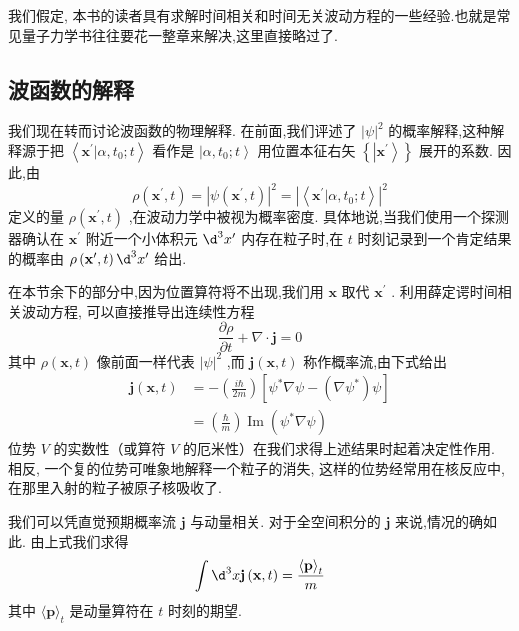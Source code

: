 \documentclass[lang=cn,newtx,10pt,scheme=chinese,thmcnt=section]{elegantbook}
\begin{document}
我们假定, 本书的读者具有求解时间相关和时间无关波动方程的一些经验.也就是常见量子力学书往往要花一整章来解决,这里直接略过了.
\subsection*{波函数的解释}
我们现在转而讨论波函数的物理解释. 在前面,我们评述了 ${\left| \psi \right| }^{2}$ 的概率解释,这种解释源于把 $\left\langle {{\mathbf{x}}^{\prime } | \alpha ,{t}_{0};t}\right\rangle$ 看作是 $\left. {| \alpha ,{t}_{0};t}\right\rangle$ 用位置本征右矢 $\left\{ \left| {\mathbf{x}}^{\prime }\right\rangle \right\}$ 展开的系数. 因此,由
\begin{equation}
	\rho \left( {{\mathbf{x}}^{\prime }, t}\right) = {\left| \psi \left( {\mathbf{x}}^{\prime }, t\right) \right| }^{2} = {\left| \left\langle {\mathbf{x}}^{\prime } | \alpha ,{t}_{0};t\right\rangle \right| }^{2}
\end{equation}
定义的量 $\rho \left( {{\mathbf{x}}^{\prime }, t}\right)$ ,在波动力学中被视为概率密度. 具体地说,当我们使用一个探测器确认在 ${\mathbf{x}}^{\prime }$ 附近一个小体积元 ${\d}^{3}{x}^{\prime }$ 内存在粒子时,在 $t$ 时刻记录到一个肯定结果的概率由 $\rho \left( {{\mathbf{x}}^{\prime }, t}\right) {\d}^{3}{x}^{\prime }$ 给出.

在本节余下的部分中,因为位置算符将不出现,我们用 $\mathbf{x}$ 取代 ${\mathbf{x}}^{\prime }$ . 利用薛定谔时间相关波动方程, 可以直接推导出连续性方程
\begin{equation}
	\frac{\partial \rho }{\partial t} + \nabla \cdot \mathbf{j} = 0
\end{equation}
其中 $\rho \left( {\mathbf{x}, t}\right)$ 像前面一样代表 ${\left| \psi \right| }^{2}$ ,而 $\mathbf{j}\left( {\mathbf{x}, t}\right)$ 称作概率流,由下式给出
\begin{equation}
	\begin{aligned}
		\mathbf{j}\left( {\mathbf{x}, t}\right) &= - \left( \frac{i\hbar }{2m}\right) \left\lbrack {{\psi }^{ * }\nabla \psi - \left( {\nabla {\psi }^{ * }}\right) \psi }\right\rbrack\\
		&= \left( \frac{\hbar }{m}\right) \operatorname{Im}\left( {{\psi }^{ * }\nabla \psi }\right)
	\end{aligned}
\end{equation}
位势 $V$ 的实数性（或算符 $V$ 的厄米性）在我们求得上述结果时起着决定性作用. 相反, 一个复的位势可唯象地解释一个粒子的消失, 这样的位势经常用在核反应中, 在那里入射的粒子被原子核吸收了.

我们可以凭直觉预期概率流 $\mathbf{j}$ 与动量相关. 对于全空间积分的 $\mathbf{j}$ 来说,情况的确如此. 由上式我们求得
\begin{equation}
	\int {\d}^{3}x\mathbf{j}\left( {\mathbf{x}, t}\right) = \frac{\langle \mathbf{p}{\rangle }_{t}}{m}
\end{equation}
其中 $\langle \mathbf{p}{\rangle }_{t}$ 是动量算符在 $t$ 时刻的期望.
\end{document}
